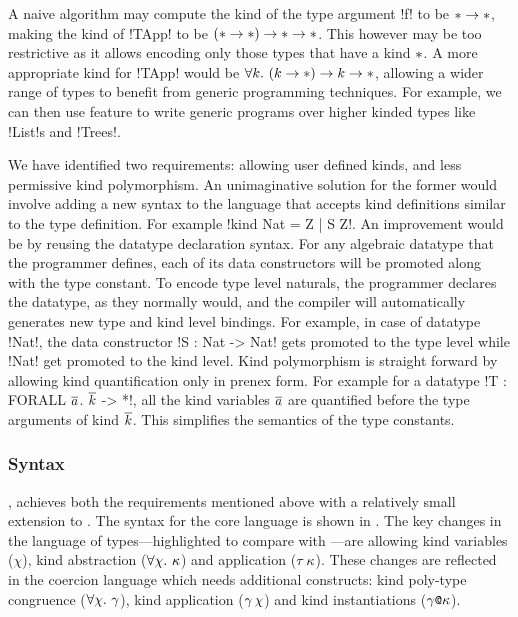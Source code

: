 \documentclass[manuscript,screen,nonacm]{acmart}
\begin{document}
A naive algorithm may compute the kind of the type argument !f! to be $\ast \to \ast$, making the kind of !TApp! to be $(\ast \to \ast) \to \ast \to \ast$. This however may be too restrictive as it allows encoding only those types that have a kind $\ast$. A more appropriate kind for !TApp! would be $\forall k.~(k\to\ast) \to k \to \ast$, allowing a wider range of types to benefit from generic programming techniques. For example, we can then use feature to write generic programs over higher kinded types like !List!s and !Trees!\cite{magalhaes_generic_2010}.

We have identified two requirements: allowing user defined kinds, and less permissive kind polymorphism. An unimaginative solution for the former would involve adding a new syntax to the language that accepts kind definitions similar to the type definition. For example !kind Nat = Z | S Z!. An improvement would be by reusing the datatype declaration syntax. For any algebraic datatype that the programmer defines, each of its data constructors will be promoted along with the type constant. To encode type level naturals, the programmer declares the datatype, as they normally would, and the compiler will automatically generates new type and kind level bindings. For example, in case of datatype !Nat!, the data constructor !S : Nat -> Nat! gets promoted to the type level while !Nat! get promoted to the kind level. Kind polymorphism is straight forward by allowing kind quantification only in prenex form. For example for a datatype !T : FORALL $\overline{a}$. $\overline{k}$ -> *!, all the kind variables $\overline{a}$ are quantified before the type arguments of kind $\overline{k}$. This simplifies the semantics of the type constants.

\subsubsection{Syntax}
\SFP\cite{yorgey_giving_2012}, achieves both the requirements mentioned above with a relatively small extension to \SFC. The syntax for the core language is shown in . The key changes in the language of types---highlighted to compare with \SFC---are allowing kind variables ($\chi$), kind abstraction ($\forall\chi.~\kappa$) and application ($\tau\, \kappa$). These changes are reflected in the coercion language which needs additional constructs: kind poly-type congruence ($\forall\chi.~\gamma$), kind application ($\gamma\,\chi$) and kind instantiations ($\gamma\texttt{@}\kappa$).
\end{document}
